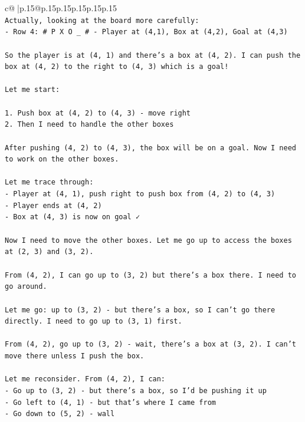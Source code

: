 \documentclass{article}
\begin{document}
{\begin{supertabular}{c@{$\;$}|p{.15\linewidth}@{}p{.15\linewidth}p{.15\linewidth}p{.15\linewidth}p{.15\linewidth}p{.15\linewidth}}
{{{\\ 
\texttt{Actually, looking at the board more carefully:} \\
\texttt{{-} Row 4: \# P X O \_ \# {-} Player at (4,1), Box at (4,2), Goal at (4,3)} \\
\\ 
\texttt{So the player is at (4, 1) and there's a box at (4, 2). I can push the box at (4, 2) to the right to (4, 3) which is a goal!} \\
\\ 
\texttt{Let me start:} \\
\\ 
\texttt{1. Push box at (4, 2) to (4, 3) {-} move right} \\
\texttt{2. Then I need to handle the other boxes} \\
\\ 
\texttt{After pushing (4, 2) to (4, 3), the box will be on a goal. Now I need to work on the other boxes.} \\
\\ 
\texttt{Let me trace through:} \\
\texttt{{-} Player at (4, 1), push right to push box from (4, 2) to (4, 3)} \\
\texttt{{-} Player ends at (4, 2)} \\
\texttt{{-} Box at (4, 3) is now on goal ✓} \\
\\ 
\texttt{Now I need to move the other boxes. Let me go up to access the boxes at (2, 3) and (3, 2).} \\
\\ 
\texttt{From (4, 2), I can go up to (3, 2) but there's a box there. I need to go around.} \\
\\ 
\texttt{Let me go: up to (3, 2) {-} but there's a box, so I can't go there directly. I need to go up to (3, 1) first.} \\
\\ 
\texttt{From (4, 2), go up to (3, 2) {-} wait, there's a box at (3, 2). I can't move there unless I push the box.} \\
\\ 
\texttt{Let me reconsider. From (4, 2), I can:} \\
\texttt{{-} Go up to (3, 2) {-} but there's a box, so I'd be pushing it up} \\
\texttt{{-} Go left to (4, 1) {-} but that's where I came from} \\
\texttt{{-} Go down to (5, 2) {-} wall} \\
}}}
\end{supertabular}}
\end{document}
